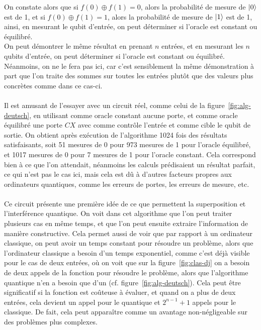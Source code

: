 On constate alors que si $f(0) \oplus f(1) = 0$, alors la probabilité de mesure de
$\ket{0}$ est de 1, et si $f(0) \oplus f(1) = 1$, alors la probabilité de mesure de
$\ket{1}$ est de 1, ainsi, en mesurant le qubit d'entrée, on peut déterminer si
l'oracle est constant ou équilibré.\\
On peut démontrer le même résultat en prenant $n$ entrées, et en mesurant les $n$
qubits d'entrée, on peut déterminer si l'oracle est constant ou équilibré.
Néanmoins, on ne le fera pas ici, car c'est sensiblement la même démonstration à part
que l'on traite des sommes sur toutes les entrées plutôt que des valeurs plus concrètes
comme dans ce cas-ci.\\ \\
Il est amusant de l'essayer avec un circuit réel, comme celui de la figure~\ref{fig:alg-deutsch},
en utilisant comme oracle constant aucune porte, et comme oracle équilibré une porte
$CX$ avec comme contrôle l'entrée et comme cible le qubit de sortie.
On obtient après exécution de l'algorithme 1024 fois des résultats satisfaisants,
soit 51 mesures de 0 pour 973 mesures de 1 pour l'oracle équilibré, et 1017 mesures
de 0 pour 7 mesures de 1 pour l'oracle constant.
Cela correspond bien à ce que l'on attendait, néanmoins les calculs prédisaient un résultat
parfait, ce qui n'est pas le cas ici, mais cela est dû à d'autres facteurs propres
aux ordinateurs quantiques, comme les erreurs de portes, les erreurs de mesure, etc.\\ \\
Ce circuit présente une première idée de ce que permettent la superposition et l'interférence
quantique.
On voit dans cet algorithme que l'on peut traiter plusieurs cas en même temps, et
que l'on peut ensuite extraire l'information de manière constructive.
Cela permet aussi de voir que par rapport à un ordinateur classique, on peut avoir
un temps constant pour résoudre un problème, alors que l'ordinateur classique a besoin
d'un temps exponentiel, comme c'est déjà visible pour le cas de deux entrées, où on
voit que sur la figure~\ref{fig:clas-dj} on a besoin de deux appels de la fonction
pour résoudre le problème, alors que l'algorithme quantique n'en a besoin que d'un
(cf. figure~\ref{fig:alg-deutsch}).
Cela peut être significatif si la fonction est coûteuse à évaluer, et quand on a plus
de deux entrées, cela devient un appel pour le quantique et $2^{n-1}+1$ appels pour
le classique.
De fait, cela peut apparaître comme un avantage non-négligeable sur des problèmes
plus complexes.

